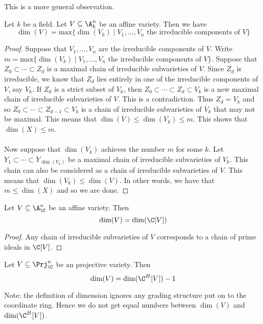 \documentclass[a4paper]{article}
\begin{document}
This is a more general observation. 

\begin{lmm}{}{} Let $k$ be a field. Let $V\subseteq\A_k^n$ be an affine variety. Then we have $$\dim(V)=\text{max}\{\dim(V_k)\;|\;V_1,\dots,V_n\text{ the irreducible components of }V\}$$ \tcbline
\begin{proof}
Suppose that $V_1,\dots,V_n$ are the irreducible components of $V$. Write $m=\text{max}\{\dim(V_k)\;|\;V_1,\dots,V_n\text{ the irreducible components of }V\}$. Suppose that $Z_0\subset\cdots\subset Z_d$ is a maximal chain of irreducible subvarieties of $V$. Since $Z_d$ is irreducible, we know that $Z_d$ lies entirely in one of the irreducible components of $V$, say $V_k$. If $Z_d$ is a strict subset of $V_k$, then $Z_0\subset\cdots\subset Z_d\subset V_k$ is a new maximal chain of irreducible subvarieties of $V$. This is a contradiction. Thus $Z_d=V_k$ and so $Z_0\subset\cdots\subset Z_{d-1}\subset V_k$ is a chain of irreducible subvarieties of $V_k$ that may not be maximal. This means that $\dim(V)\leq\dim(V_k)\leq m$. This shows that $\dim(X)\leq m$. \\~\\

Now suppose that $\dim(V_k)$ achieves the number $m$ for some $k$. Let $Y_1\subset\cdots\subset Y_{\dim(V_k)}$ be a maximal chain of irreducible subvarieties of $V_k$. This chain can also be considered as a chain of irreducible subvarieties of $V$. This means that $\dim(V_k)\leq\dim(V)$. In other words, we have that $m\leq\dim(X)$ and so we are done. 
\end{proof}
\end{lmm}

\begin{prp}{}{} Let $V\subseteq\A_\C^n$ be an affine variety. Then $$\dim(V)=\dim(\C[V])$$ \tcbline
\begin{proof}
Any chain of irreducible subvarieties of $V$ corresponds to a chain of prime ideals in $\C[V]$. 
\end{proof}
\end{prp}

\begin{prp}{}{} Let $V\subseteq\Prj_\C^n$ be an projective variety. Then $$\dim(V)=\dim(\C^H[V])-1$$
\end{prp}

Note: the definition of dimension ignores any grading structure put on to the coordinate ring. Hence we do not get equal numbers between $\dim(V)$ and $\dim(\C^H[V])$. 
\end{document}

